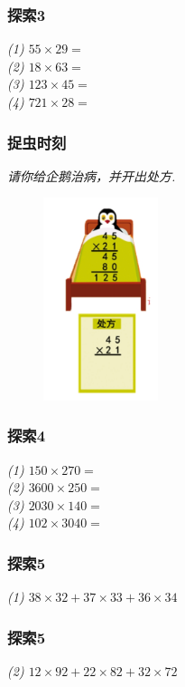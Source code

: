 \begin{frame}
    \frametitle{探索3}
    \vspace*{-2cm}
    \textit{(1) $55\times 29 = $\\
        (2) $18\times 63 = $\\
        (3) $123\times 45 = $\\
        (4) $721\times 28 = $}
\end{frame}

\begin{frame}
    \frametitle{捉虫时刻}
    \textit{请你给企鹅治病，并开出处方.}
    \begin{figure}[H] 
        \centering
        \includegraphics[width=0.3\textwidth]{./pics/Chapter_4/zhuochong.png}
    \end{figure}
\end{frame}

\begin{frame}
    \frametitle{探索4}
    \vspace*{-2cm}
    \textit{(1) $150\times 270 = $\\
        (2) $3600\times 250 = $\\
        (3) $2030\times 140 = $\\
        (4) $102\times 3040 = $}
\end{frame}

\begin{frame}
    \frametitle{探索5}
    \vspace*{-2cm}
    \textit{(1) $38\times 32 + 37\times 33 + 36\times 34$}
\end{frame}

\begin{frame}
    \frametitle{探索5}
    \vspace*{-2cm}
    \textit{(2) $12\times 92 + 22\times 82 + 32\times 72$}
\end{frame}

